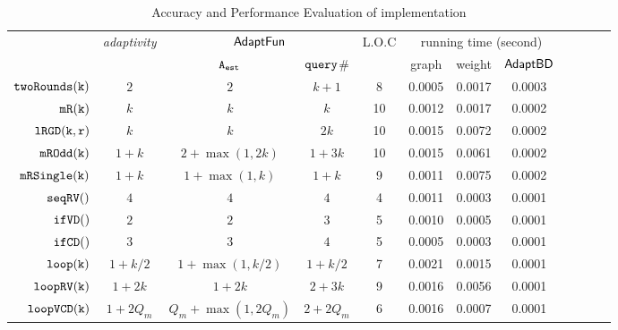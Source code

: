 {\scriptsize
\begin {table}[t]
    \caption{Accuracy and Performance Evaluation of {\THESYSTEM} implementation}
        \label{tb:adapt-imp}
        \begin{center}
        \centering
{
        \begin{tabular}{| >{\tiny}r | c | c | c | c | c | c | c | c | c | c | c }
         \hline \hline
        \multirow{2}{*}{Program $c$} & 
        \multirow{2}{*}{\emph{adaptivity}}
         & \multicolumn{2}{c|}{$\textsf{AdaptFun}$}
         & \multirow{2}{*}{L.O.C}
         & \multicolumn{3}{c|}{running time (second)} \\ 
         \cline{3-4} \cline{6-8}
         & & {${\mathtt{A_{est}}}$ } & {${\tt query}$\# } &  & graph & weight & $\mathsf{AdaptBD}$ \\ 
         \cline{6-8}
         \hline \hline
         $  \mathtt{twoRounds(k)}$ & $2$ &  $2$ & $k+1 $  & 8 & 0.0005 & 0.0017 & 0.0003 \\
         $  \mathtt{mR(k)}$ & $k$ &  $k$ & $k$  &  10 & 0.0012 & 0.0017  & 0.0002 \\
         $  \mathtt{lRGD(k, r)}$ & $k$ & $k  $ & $ 2k $  &  10 & 0.0015 & 0.0072  & 0.0002  \\
         $  \mathtt{mROdd(k)}$ & $1 + k$ &  $2+\max(1,2k)  $ & $1 + 3 k  $  &  10 & 0.0015 & 0.0061  & 0.0002 \\
         $  \mathtt{mRSingle(k)}$    & $1 + k$ &  $1+ \max(1, k) $ & $1 + k $  &  9 & 0.0011 & 0.0075  & 0.0002 \\
         $  \mathtt{seqRV()}$ & $4$ & $4$ &  $4$ & 4 & 0.0011 & 0.0003 & 0.0001 \\  
         $  \mathtt{ifVD()}$ & $2$ & $2$ &  $3$ & 5 & 0.0010 & 0.0005  & 0.0001 \\
         $  \mathtt{ifCD()}$ & $3$ & $3 $ &   $4$  & 5 & 0.0005 & 0.0003   & 0.0001 \\
         $  \mathtt{loop(k)}$ & $1+k/2$ &   $1 +\max(1, k/2)  $  &  $1+k/2  $ & 7 & 0.0021 & 0.0015 &  0.0001 \\
         $  \mathtt{loopRV(k)}$ & $1 + 2k$ &  $1 + 2k$ & $2 + 3 k$  &  9 & 0.0016 & 0.0056 & 0.0001  \\
         $  {\mathtt{loopVCD(k)}} $ & ${1 + 2Q_m}$ &  ${Q_m+\max(1,2Q_m)}$  & $2+2Q_m$   &  6 & 0.0016 & 0.0007 & 0.0001 \\

\end{tabular}}
\end{center}
\end{table}}
